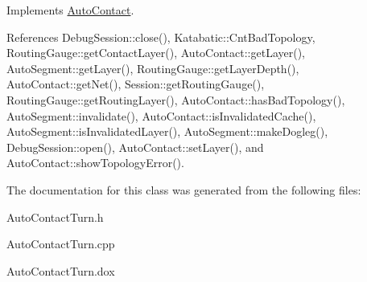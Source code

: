 

Implements \mbox{\hyperlink{classKatabatic_1_1AutoContact_a690764ddc997fe9766a79c4b8e0c3e2f}{Auto\+Contact}}.



References Debug\+Session\+::close(), Katabatic\+::\+Cnt\+Bad\+Topology, Routing\+Gauge\+::get\+Contact\+Layer(), Auto\+Contact\+::get\+Layer(), Auto\+Segment\+::get\+Layer(), Routing\+Gauge\+::get\+Layer\+Depth(), Auto\+Contact\+::get\+Net(), Session\+::get\+Routing\+Gauge(), Routing\+Gauge\+::get\+Routing\+Layer(), Auto\+Contact\+::has\+Bad\+Topology(), Auto\+Segment\+::invalidate(), Auto\+Contact\+::is\+Invalidated\+Cache(), Auto\+Segment\+::is\+Invalidated\+Layer(), Auto\+Segment\+::make\+Dogleg(), Debug\+Session\+::open(), Auto\+Contact\+::set\+Layer(), and Auto\+Contact\+::show\+Topology\+Error().



The documentation for this class was generated from the following files\+:\begin{DoxyCompactItemize}
\item 
Auto\+Contact\+Turn.\+h\item 
Auto\+Contact\+Turn.\+cpp\item 
Auto\+Contact\+Turn.\+dox\end{DoxyCompactItemize}
